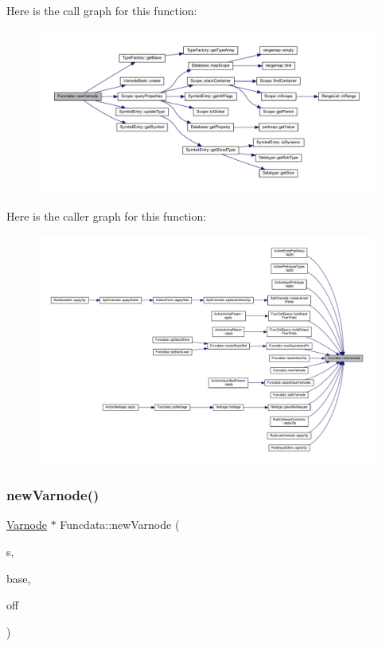 Here is the call graph for this function\+:
\nopagebreak
\begin{figure}[H]
\begin{center}
\leavevmode
\includegraphics[width=350pt]{class_funcdata_a22894e1c7b0f30a5391993924cd96d3d_cgraph}
\end{center}
\end{figure}
Here is the caller graph for this function\+:
\nopagebreak
\begin{figure}[H]
\begin{center}
\leavevmode
\includegraphics[width=350pt]{class_funcdata_a22894e1c7b0f30a5391993924cd96d3d_icgraph}
\end{center}
\end{figure}
\mbox{\label{class_funcdata_a0d6888d1606fd8ed6372355995bc7887}} 
\subsubsection{\texorpdfstring{newVarnode()}{newVarnode()}\hspace{0.1cm}{\footnotesize\ttfamily [2/2]}}
{\footnotesize\ttfamily \mbox{\hyperlink{class_varnode}{Varnode}} $\ast$ Funcdata\+::new\+Varnode (\begin{DoxyParamCaption}\item[{int4}]{s,  }\item[{\mbox{\hyperlink{class_addr_space}{Addr\+Space}} $\ast$}]{base,  }\item[{\mbox{\hyperlink{types_8h_a2db313c5d32a12b01d26ac9b3bca178f}{uintb}}}]{off }\end{DoxyParamCaption})}



